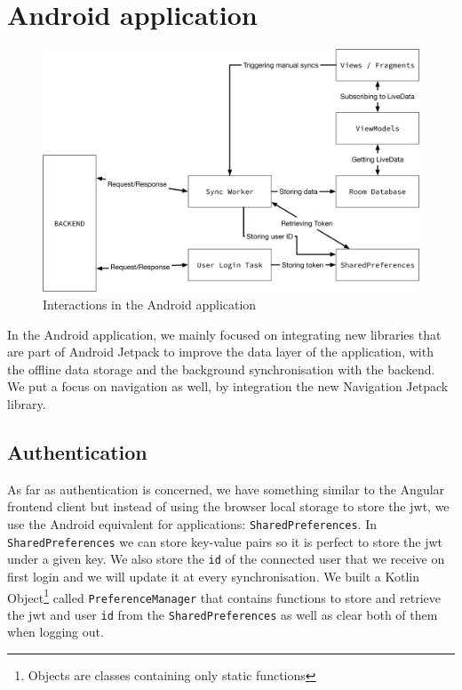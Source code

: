 \documentclass[twoside, openright,11pt,a4paper]{book}
\begin{document}
\section{Android application}
\begin{figure}[H]
\begin{center}
	\includegraphics[width=\textwidth]{assets/android_implementation}
	\caption{Interactions in the Android application}
\end{center}
\end{figure}
In the Android application, we mainly focused on integrating new libraries that are part of Android Jetpack to improve the data layer of the application, with the offline data storage and the background synchronisation with the backend. We put a focus on navigation as well, by integration the new Navigation Jetpack library.
\subsection{Authentication}
As far as authentication is concerned, we have something similar to the Angular frontend client but instead of using the browser local storage to store the \gls{jwt}, we use the Android equivalent for applications: \verb+SharedPreferences+. In \verb+SharedPreferences+ we can store key-value pairs so it is perfect to store the \gls{jwt} under a given key. We also store the \verb+id+ of the connected user that we receive on first login and we will update it at every synchronisation. We built a Kotlin Object\footnote{Objects are classes containing only static functions} called \verb+PreferenceManager+ that contains functions to store and retrieve the \gls{jwt} and user \verb+id+ from the \verb+SharedPreferences+ as well as clear both of them when logging out.
\end{document}
